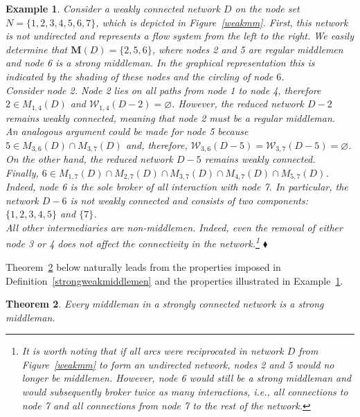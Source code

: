\documentclass[11pt,fleqn]{article}
\newtheorem{theorem}{Theorem}[section]
\newtheorem{expl}[theorem]{Example}
\newenvironment{example}{\begin{expl} \rm}{\hfill $\blacklozenge$ \end{expl}}{}
\begin{document}
\begin{example} \label{identifyingmiddlemen}
Consider a weakly connected network $D$ on the node set $N=\{1,2,3,4,5,6,7\}$, which is depicted in Figure~\ref{weakmm}. First, this network is not undirected and represents a flow system from the left to the right. We easily determine that $\mathbf M (D)=\{2,5,6\}$, where nodes 2 and 5 are regular middlemen and node 6 is a strong middleman. In the graphical representation this is indicated by the shading of these nodes and the circling of node $6$.
\\
Consider node 2. Node 2 lies on all paths from node 1 to node 4, therefore $2 \in M_{1,4}(D)$ and $\mathcal{W}_{1,4}(D - 2) = \varnothing$. However, the reduced network $D - 2$ remains weakly connected, meaning that node 2 must be a regular middleman.
\\
An analogous argument could be made for node 5 because $5 \in M_{3,6} (D) \cap M_{3,7} (D)$ and, therefore, $\mathcal{W}_{3,6}(D - 5) = \mathcal{W}_{3,7}(D - 5) = \varnothing$. On the other hand, the reduced network $D - 5$ remains weakly connected.
\\
Finally, $6 \in M_{1,7}(D) \cap M_{2,7}(D) \cap M_{3,7}(D) \cap M_{4,7}(D) \cap M_{5,7}(D)$. Indeed, node 6 is the sole broker of all interaction with node 7. In particular, the network $D - 6$ is not weakly connected and consists of two components: $\{ 1,2,3,4,5 \}$ and $\{ 7 \}$.
\\
All other intermediaries are non-middlemen. Indeed, even the removal of either node 3 or 4 does not affect the connectivity in the network.\footnote{It is worth noting that if all arcs were reciprocated in network $D$ from Figure~\ref{weakmm} to form an undirected network, nodes 2 and 5 would no longer be middlemen. However, node 6 would still be a strong middleman and would subsequently broker twice as many interactions, i.e., all connections to node 7 and all connections from node 7 to the rest of the network.}
\end{example}

\noindent
Theorem~\ref{undirectedmiddlemen} below naturally leads from the properties imposed in Definition~\ref{strongweakmiddlemen} and the properties illustrated in Example~\ref{identifyingmiddlemen}.

\begin{theorem} \label{undirectedmiddlemen}
Every middleman in a strongly connected network is a strong middleman.
\end{theorem}
\end{document}
